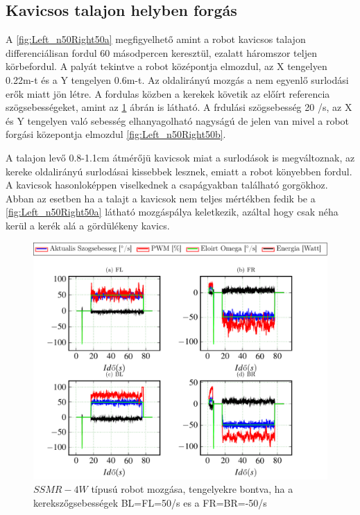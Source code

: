 \subsection{Kavicsos talajon helyben forgás}
A \ref{fig:Left_n50Right50a} megfigyelhető amint a robot kavicsos talajon differenciálisan fordul 60 másodpercen keresztül, ezalatt háromszor teljen körbefordul. A palyát tekintve a robot középontja elmozdul, az X tengelyen 0.22m-t és a Y tengelyen 0.6m-t.  Az oldalirányú mozgás a nem egyenlő surlodási erők miatt jön létre.
A fordulas közben a kerekek követik az előírt referencia szögsebességeket, amint az \ref{fig:Left_n50Right50x} ábrán is látható.
A frdulási szögsebesség 20 \degree/s, az X és Y tengelyen való sebesség elhanyagolható nagyságú de jelen van mivel a robot forgási közepontja elmozdul \ref{fig:Left_n50Right50b}.

A talajon levő 0.8-1.1cm átmérőjü kavicsok miat a surlodások is megváltoznak, az kereke oldalirányú surlodásai kissebbek lesznek, emiatt a robot könyebben fordul. A kavicsok hasonloképpen viselkednek a csapágyakban található gorgökhoz.
Abban az esetben ha a talajt a kavicsok nem teljes mértékben fedik be a \ref{fig:Left_n50Right50a} látható mozgáspálya keletkezik, azáltal hogy csak néha kerül a kerék alá a gördülékeny kavics.

\renewcommand{\nth}{2}
\renewcommand{\GlobalPath}{Meresek/Mozgasok/NormalMukodes/DiferencialisanHelybeKavicsos/}
\renewcommand{\secondImage}{*}



\begin{figure}[H]
  \includegraphics{tikz/Left_n50Right50x.pdf}
  \caption{$SSMR-4W$ típusú robot mozgása, tengelyekre bontva, ha a kerekszőgsebességek BL=FL=50\degree/s es a FR=BR=-50\degree/s}
  \label{fig:Left_n50Right50x}
\end{figure}



